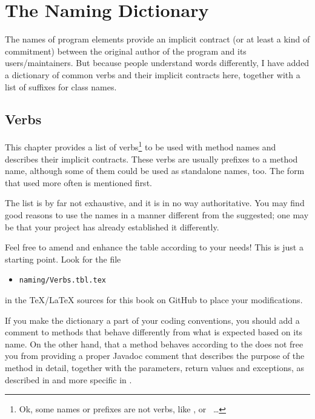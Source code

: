 \chapter{The Naming Dictionary}\label{sec:TheNamingDictionary}
The names of program elements provide an implicit contract (or at least a kind of commitment) between the original author of the program and its users/maintainers. But because people understand words differently, I have added a dictionary of common verbs and their implicit contracts here, together with a list of suffixes for class names.


\section{Verbs}\label{sec:TheNamingDictionary:Verbs}
This chapter provides a list of verbs\footnote{Ok, some names or prefixes are not verbs, like ,   or ~…} to be used with method names and describes their implicit contracts. These verbs are usually prefixes to a method name, although some of them could be used as standalone names, too. The form that used more often is mentioned first.

The list is by far not exhaustive, and it is in no way authoritative. You may find good reasons to use the names in a manner different from the suggested; one may be that your project has already established it differently.

Feel free to amend and enhance the table according to your needs! This is just a starting point. Look for the file
\begin{itemize}
	\item{\texttt{naming/Verbs.tbl.tex}}
\end{itemize}
in the \TeX/\LaTeX{} sources for this book on GitHub \autocite{TQUADRAT_ORG_DOCUMENT_REPOSITORY} to place your modifications.

If you make the dictionary a part of your coding conventions, you should add a comment to methods that behave differently from what is expected based on its name. On the other hand, that a method behaves according to the  does not free you from providing a proper Javadoc comment that describes the purpose of the method in detail, together with the parameters, return values and exceptions, as described in  and more specific in .

